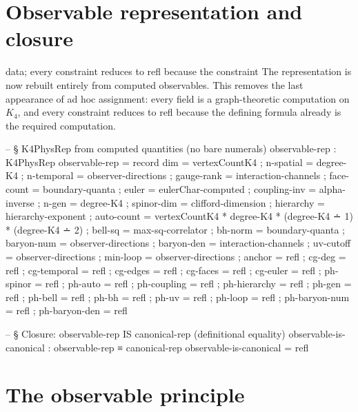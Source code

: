\documentclass[11pt,a4paper]{book}
\def\texttt#1{#1}%
\begin{document}
\section{Observable representation and closure}

data; every constraint reduces to \texttt{refl} because the constraint
The representation is now rebuilt entirely from computed observables. This removes the last appearance of ad hoc assignment: every field is a graph-theoretic computation on $K_4$, and every constraint reduces to \texttt{refl} because the defining formula already is the required computation.

\begin{code}
  -- § K4PhysRep from computed quantities (no bare numerals)
  observable-rep : K4PhysRep
  observable-rep = record
    { dim          = vertexCountK4
    ; n-spatial    = degree-K4
    ; n-temporal   = observer-directions
    ; gauge-rank   = interaction-channels
    ; face-count   = boundary-quanta
    ; euler        = eulerChar-computed
    ; coupling-inv = alpha-inverse
    ; n-gen        = degree-K4
    ; spinor-dim   = clifford-dimension
    ; hierarchy    = hierarchy-exponent
    ; auto-count   = vertexCountK4 * degree-K4
                   * (degree-K4 ∸ 1) * (degree-K4 ∸ 2)
    ; bell-sq      = max-sq-correlator
    ; bh-norm      = boundary-quanta
    ; baryon-num   = observer-directions
    ; baryon-den   = interaction-channels
    ; uv-cutoff    = observer-directions
    ; min-loop     = observer-directions
    ; anchor       = refl
    ; cg-deg       = refl
    ; cg-temporal  = refl
    ; cg-edges     = refl
    ; cg-faces     = refl
    ; cg-euler     = refl
    ; ph-spinor    = refl
    ; ph-auto      = refl
    ; ph-coupling  = refl
    ; ph-hierarchy = refl
    ; ph-gen       = refl
    ; ph-bell      = refl
    ; ph-bh        = refl
    ; ph-uv        = refl
    ; ph-loop      = refl
    ; ph-baryon-num = refl
    ; ph-baryon-den = refl
    }

  -- § Closure: observable-rep IS canonical-rep (definitional equality)
  observable-is-canonical : observable-rep ≡ canonical-rep
  observable-is-canonical = refl
\end{code}


\section{The observable principle}
\end{document}
